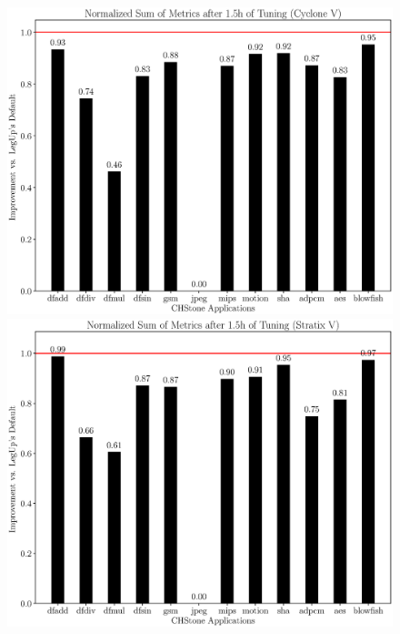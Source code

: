 \documentclass[12pt, a4paper]{article}
\begin{document}
\newpage

\begin{figure}[htpb]
    \centering
    \begin{minipage}{.48\textwidth}
        \centering
        \includegraphics[scale=.25]{nsam_5400_chstone_CycloneV}
    \end{minipage}%
    \hfill
    \begin{minipage}{.48\textwidth}
        \centering
        \includegraphics[scale=.25]{nsam_5400_chstone_StratixV}
    \end{minipage}%
\end{figure}
\end{document}
